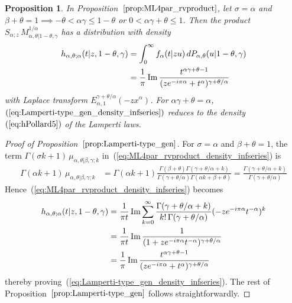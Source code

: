\documentclass[a4paper,12pt]{article}
\newtheorem{proposition}{Proposition}
\begin{document}
{{{\begin{proposition}
\label{prop:Lamperti-type_gen}
In Proposition~$\ref{prop:ML4par_rvproduct}$, let  $\sigma=\alpha$ and  $\beta+\theta=1 \implies -\theta<\alpha\gamma \le1-\theta$
or $0< \alpha\gamma+\theta\le 1$. 
Then the product $S_{\alpha;z} \, M_{\alpha,\theta\vert 1-\theta,\gamma}^{1/\alpha}$  has a distribution with density
\begin{align}
h_{\alpha,\theta; \alpha}(t \vert z , 1-\theta,\gamma)
&=  \int_0^\infty  f_\alpha(t \vert z u) \, dP_{\alpha,\theta}(u\vert 1-\theta,\gamma)
\label{eq:Lamperti-type_gen_density} \\
&= \frac{1}{\pi} \, {\rm Im} \,    \frac{t^{\alpha\gamma+\theta-1}}{(z e^{-i\pi\alpha}+t^{\alpha})^{\gamma+\theta/\alpha}}
\label{eq:Lamperti-type_gen_density_infseries}
\end{align}
with Laplace transform $E^{\gamma+\theta/\alpha}_{\alpha,1}(-z x^\alpha)$.
For $\alpha\gamma+\theta=\alpha$,~$(\ref{eq:Lamperti-type_gen_density_infseries})$  reduces to the density~$(\ref{eq:hPollard5})$ of  the Lamperti laws. 
\end{proposition}

\begin{proof} [Proof of Proposition~$\ref{prop:Lamperti-type_gen}$]
For  $\sigma=\alpha$ and $\beta+\theta=1$, 
the term $\Gamma(\sigma k+1) \, \mu_{\alpha,\theta\vert\beta,\gamma;k}$ in~(\ref{eq:ML4par_rvproduct_density_infseries}) is
\begin{align*}
\Gamma(\alpha k+1)\,  \mu_{\alpha,\theta\vert\beta,\gamma;k} &= \Gamma(\alpha k+1)
 \frac{\Gamma(\beta+\theta)\Gamma(\gamma+\theta/\alpha+k)}{\Gamma(\gamma+\theta/\alpha)\Gamma(\alpha k+\beta+\theta)}  
 = \frac{\Gamma(\gamma+\theta/\alpha+k)}{\Gamma(\gamma+\theta/\alpha)}
\end{align*}
Hence~(\ref{eq:ML4par_rvproduct_density_infseries}) becomes
\begin{align*}
h_{\alpha,\theta; \alpha}(t \vert z , 1-\theta,\gamma)
&=   \frac{1}{\pi t}\,  {\rm Im} \sum_{k=0}^\infty  \frac{\Gamma(\gamma+\theta/\alpha+k)}{k! \, \Gamma(\gamma+\theta/\alpha)}
(-z e^{-i\pi\alpha} t^{-\alpha})^k \\
&=  \frac{1}{\pi t}\,  {\rm Im} \, \frac{1}{(1+z e^{-i\pi\alpha}t^{-\alpha})^{\gamma+\theta/\alpha}} \\
&=   \frac{1}{\pi}\,  {\rm Im} \,  \frac{t^{\alpha\gamma+\theta-1}}{(z e^{-i\pi\alpha}+t^{\alpha})^{\gamma+\theta/\alpha}}
 \end{align*}
 thereby proving~(\ref{eq:Lamperti-type_gen_density_infseries}).
 The rest of Proposition~$\ref{prop:Lamperti-type_gen}$ follows straightforwardly.
\end{proof}


}}}
\end{document}

